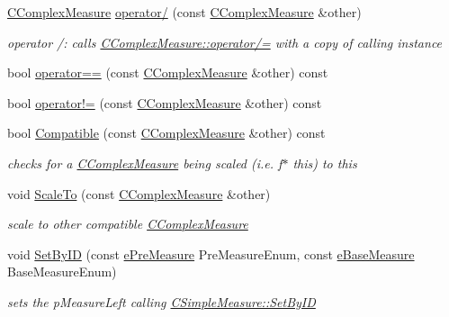 \begin{DoxyCompactItemize}
\hyperlink{classCComplexMeasure}{C\+Complex\+Measure} \hyperlink{classCComplexMeasure_a730c8745ab3d499a20d09f6faa47bdd2}{operator/} (const \hyperlink{classCComplexMeasure}{C\+Complex\+Measure} \&other)
\begin{DoxyCompactList}\small\item\em operator /\+: calls \hyperlink{classCComplexMeasure_a68c42a3ea08d1482f4dfdda5e34407f5}{C\+Complex\+Measure\+::operator/=} with a copy of calling instance \end{DoxyCompactList}\item 
bool \hyperlink{classCComplexMeasure_a30c168c8fbc0587835a11914f8af69e9}{operator==} (const \hyperlink{classCComplexMeasure}{C\+Complex\+Measure} \&other) const
\item 
bool \hyperlink{classCComplexMeasure_ab5e7581c34b128a8b24a7237094a4fe4}{operator!=} (const \hyperlink{classCComplexMeasure}{C\+Complex\+Measure} \&other) const
\item 
bool \hyperlink{classCComplexMeasure_aa807816cc8d410ff08e482c5e942a1a9}{Compatible} (const \hyperlink{classCComplexMeasure}{C\+Complex\+Measure} \&other) const
\begin{DoxyCompactList}\small\item\em checks for a \hyperlink{classCComplexMeasure}{C\+Complex\+Measure} being scaled (i.\+e. f$\ast$ this) to this \end{DoxyCompactList}\item 
void \hyperlink{classCComplexMeasure_a999dd5e5bb71a6bc548f959879b4e12f}{Scale\+To} (const \hyperlink{classCComplexMeasure}{C\+Complex\+Measure} \&other)
\begin{DoxyCompactList}\small\item\em scale to other compatible \hyperlink{classCComplexMeasure}{C\+Complex\+Measure} \end{DoxyCompactList}\item 
void \hyperlink{classCComplexMeasure_a47dca89bc28bbb257f81df4d363be623}{Set\+By\+ID} (const \hyperlink{PreMeasure_8h_a6c81167b8d4c2badde42f81cb7214620}{e\+Pre\+Measure} Pre\+Measure\+Enum, const \hyperlink{BaseMeasure_8h_ac90e5164ccf1f0d648fba7e94b229a11}{e\+Base\+Measure} Base\+Measure\+Enum)
\begin{DoxyCompactList}\small\item\em sets the p\+Measure\+Left calling \hyperlink{classCSimpleMeasure_a6945aa333dca5623482d38cd9a7e3225}{C\+Simple\+Measure\+::\+Set\+By\+ID} \end{DoxyCompactList}\item 

\end{DoxyCompactItemize}
